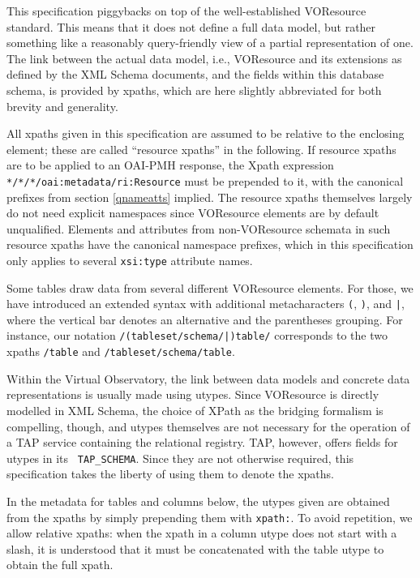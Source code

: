 \documentclass[11pt,a4paper]{ivoa}
\newcommand{\tapent}[1]{\texttt{\color{tapcolor} #1}}
\begin{document}
\label{vorutypes}

This specification piggybacks on top of the well-established
VOResource standard.  This means that it does not define a full data model,
but rather something like a reasonably query-friendly view of a partial
representation of one.  The link between the actual data model, i.e.,
VOResource and its extensions as defined by the XML Schema documents, and
the fields within this database schema, is provided by
xpaths, which are here slightly abbreviated for both brevity and
generality.

All xpaths given in this specification are assumed to be relative to
the enclosing  element; these are called
``resource xpaths'' in the following.  If resource xpaths are to be
applied to an OAI-PMH response, the Xpath expression
\texttt{*/*/*/oai:metadata/ri:Resource} must be prepended to it,
with the canonical prefixes from section \ref{qnameatts} implied.  The resource xpaths themselves
largely do not need explicit namespaces since VOResource elements are by
default unqualified.  Elements and attributes from non-VOResource
schemata in such resource xpaths have the canonical namespace prefixes, which in this
specification only applies to several \texttt{xsi:type} attribute
names.

Some tables draw data from several different VOResource elements.
For those, we have introduced an extended syntax with additional
metacharacters \verb$($, \verb$)$, and \verb$|$,
where the vertical bar denotes an
alternative and the parentheses grouping.  For instance, our notation
\texttt{/(tableset/schema/|)table/} corresponds to the two xpaths
\texttt{/table} and \texttt{/tableset/schema/table}.

Within the Virtual Observatory, the link between data models and
concrete data representations is usually made using utypes.
Since VOResource is directly modelled
in XML Schema, the choice of XPath as the bridging formalism is
compelling, though, and utypes themselves are not necessary for the
operation of a TAP service containing the relational registry.
TAP, however, offers fields for utypes in its \tapent{TAP\_SCHEMA}.  Since they
are not otherwise required, this specification takes the liberty of
using them to denote the xpaths.

In the metadata for tables and columns below, the utypes given are
obtained from the xpaths by simply prepending them with
\texttt{xpath:}.  To avoid repetition, we allow relative xpaths:
when the xpath in a column utype does not start with a slash, it is
understood that it must be concatenated with the table utype to obtain
the full xpath.
\end{document}
